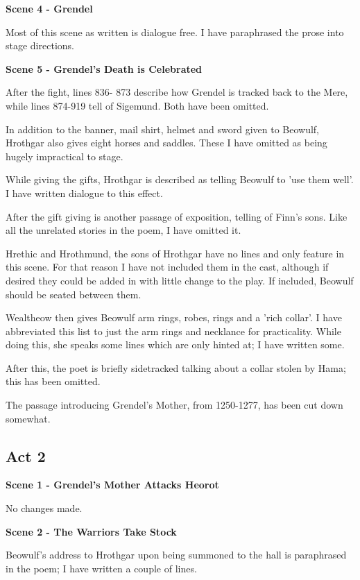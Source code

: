 \documentclass[a4paper]{article}
\begin{document}
{\centerline{\textbf{Scene 4 - Grendel}}

Most of this scene as written is dialogue free. I have paraphrased the prose into
stage directions.

\centerline{\textbf{Scene 5 - Grendel's Death is Celebrated}}

After the fight, lines 836- 873 describe how Grendel is tracked back to the Mere, while
lines 874-919 tell of Sigemund. Both have been omitted.

In addition to the banner, mail shirt, helmet and sword given to Beowulf,
Hrothgar also gives eight horses and saddles. These I have omitted as being
hugely impractical to stage.

While giving the gifts, Hrothgar is described as telling Beowulf to 'use them well'.
I have written dialogue to this effect.

After the gift giving is another passage of exposition, telling of Finn's sons.
Like all the unrelated stories in the poem, I have omitted it.

Hrethic and Hrothmund, the sons of Hrothgar have no lines and only feature in this scene.
For that reason I have not included them in the cast, although if desired they 
could be added in with little change to the play. If included, Beowulf should
be seated between them.

Wealtheow then gives Beowulf arm rings, robes, rings and a 'rich collar'. I
have abbreviated this list to just the arm rings and necklance for practicality. 
While doing this, she speaks some lines which are only hinted at; I have written some.

After this, the poet is briefly sidetracked talking about a collar stolen by Hama;
this has been omitted.

The passage introducing Grendel's Mother, from 1250-1277, has been cut down somewhat.

\subsection{Act 2}%

\centerline{\textbf{Scene 1 - Grendel's Mother Attacks Heorot}}

No changes made.

\centerline{\textbf{Scene 2 - The Warriors Take Stock}}

Beowulf's address to Hrothgar upon being summoned to the hall
is paraphrased in the poem; I have written a couple of lines.

}
\end{document}
